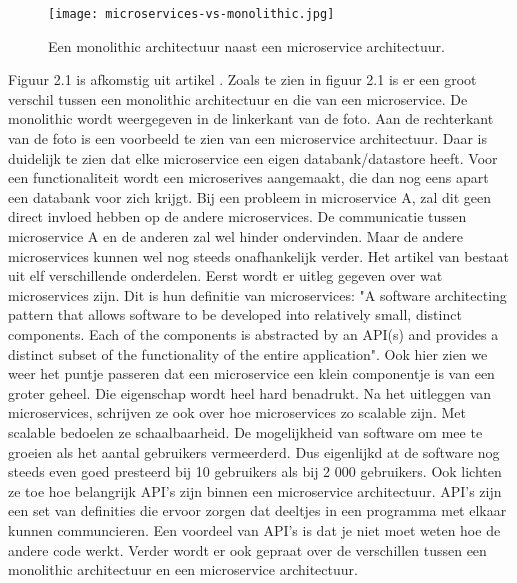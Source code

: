 \begin{figure}[h]
	\texttt{[image: microservices-vs-monolithic.jpg]}
	\centering
	\caption{Een monolithic architectuur naast een microservice architectuur. \textcite{Watts2018}}
\end{figure}
Figuur 2.1 is afkomstig uit artikel \textcite{Watts2018}.
Zoals te zien in figuur 2.1 is er een groot verschil tussen een monolithic architectuur en die van een microservice. De monolithic wordt weergegeven in de linkerkant van de foto. Aan de rechterkant van de foto is een voorbeeld te zien van een microservice architectuur. Daar is duidelijk te zien dat elke microservice een eigen databank/datastore heeft. Voor een functionaliteit wordt een microserives aangemaakt, die dan nog eens apart een databank voor zich krijgt. Bij een probleem in microservice A, zal dit geen direct invloed hebben op de andere microservices. De communicatie tussen microservice A en de anderen zal wel hinder ondervinden. Maar de andere microservices kunnen wel nog steeds onafhankelijk verder. 
Het artikel van \textcite{series2018} bestaat uit elf verschillende onderdelen. Eerst wordt er uitleg gegeven over wat microservices zijn. Dit is hun definitie van microservices: "A software architecting pattern that allows software to be developed into relatively small, distinct components. Each of the components is abstracted by an API(s) and provides a distinct subset of the functionality of the entire application". Ook hier zien we weer het puntje passeren dat een microservice een klein componentje is van een groter geheel. Die eigenschap wordt heel hard benadrukt. Na het uitleggen van microservices, schrijven ze ook over hoe microservices zo scalable zijn. Met scalable bedoelen ze schaalbaarheid. De mogelijkheid van software om mee te groeien als het aantal gebruikers vermeerderd. Dus eigenlijkd at de software nog steeds even goed presteerd bij 10 gebruikers als bij 2 000 gebruikers. Ook lichten ze toe hoe belangrijk API's zijn binnen een microservice architectuur. API's zijn een set van definities die ervoor zorgen dat deeltjes in een programma met elkaar kunnen communcieren. Een voordeel van API's is dat je niet moet weten hoe de andere code werkt. Verder wordt er ook gepraat over de verschillen tussen een monolithic architectuur en een microservice architectuur. 
